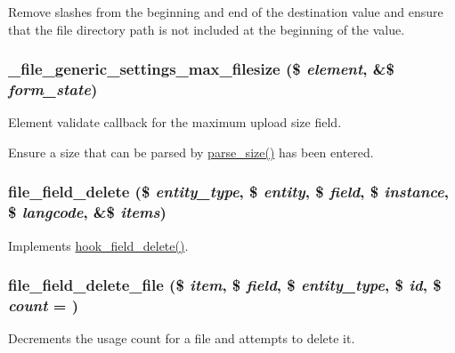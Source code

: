 Remove slashes from the beginning and end of the destination value and ensure that the file directory path is not included at the beginning of the value. \hypertarget{file_8field_8inc_a202df25868194246cdeeef039fb5d064}{
\subsubsection[{\_\-file\_\-generic\_\-settings\_\-max\_\-filesize}]{\setlength{\rightskip}{0pt plus 5cm}\_\-file\_\-generic\_\-settings\_\-max\_\-filesize (\$ {\em element}, \/  \&\$ {\em form\_\-state})}}
\label{file_8field_8inc_a202df25868194246cdeeef039fb5d064}
Element validate callback for the maximum upload size field.

Ensure a size that can be parsed by \hyperlink{group__format_ga08382023ada29bae2a6a94f22196b066}{parse\_\-size()} has been entered. \hypertarget{file_8field_8inc_a33f51903eac915f080a4621133896352}{
\subsubsection[{file\_\-field\_\-delete}]{\setlength{\rightskip}{0pt plus 5cm}file\_\-field\_\-delete (\$ {\em entity\_\-type}, \/  \$ {\em entity}, \/  \$ {\em field}, \/  \$ {\em instance}, \/  \$ {\em langcode}, \/  \&\$ {\em items})}}
\label{file_8field_8inc_a33f51903eac915f080a4621133896352}
Implements \hyperlink{group__field__types_gaf1e5787044b83d34cf7daed3d5297336}{hook\_\-field\_\-delete()}. \hypertarget{file_8field_8inc_a5e89e8a4352c9a6444d8736d94aa3cb9}{
\subsubsection[{file\_\-field\_\-delete\_\-file}]{\setlength{\rightskip}{0pt plus 5cm}file\_\-field\_\-delete\_\-file (\$ {\em item}, \/  \$ {\em field}, \/  \$ {\em entity\_\-type}, \/  \$ {\em id}, \/  \$ {\em count} = {})}}
\label{file_8field_8inc_a5e89e8a4352c9a6444d8736d94aa3cb9}
Decrements the usage count for a file and attempts to delete it.

